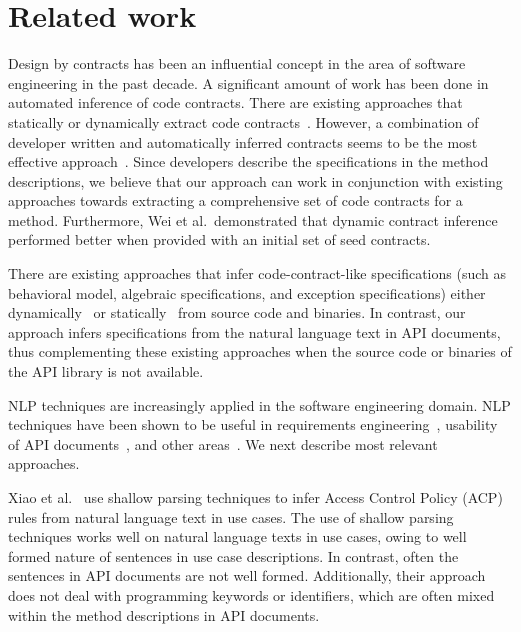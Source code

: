 \section{Related work}
\label{sec:related}


Design by contracts has been an influential concept in the area of software engineering in the past decade. A significant amount of work has been done in automated inference of code contracts. There are existing approaches that statically or dynamically extract code contracts~\cite{csallner08dysy, NimmerE02:ISSTA, Tillmann:2006:DLM:2105385.2105433}. However, a combination of developer written and automatically inferred contracts seems to be the most effective approach~\cite{FrakesIEEETran05,Polikarpova2009ISSTA}. Since developers describe the specifications in the method descriptions, we believe that our approach can work in conjunction with existing approaches towards extracting a comprehensive set of code contracts for a method. Furthermore, Wei et al.~\cite{WeiICSE11}demonstrated that dynamic contract inference performed better when provided with an initial set of seed contracts.




There are existing approaches that infer code-contract-like specifications (such as behavioral model, algebraic specifications, and exception specifications) either dynamically~\cite{Ghezzi:2009:SIB:1555001.1555057,Henkel07documentation,Henkel:2008:DDA:1363102.1363105} or statically~\cite{Buse:2008:ADI:1390630.1390664,FrakesIEEETran05} from source code and binaries. In contrast, our approach infers specifications from the natural language text in API documents, thus complementing these existing approaches when the source code or binaries of the API library is not available.


NLP techniques are increasingly applied in the software engineering domain. NLP techniques have been shown to be useful in requirements engineering~\cite{Gervasi2005,Sinha2009,Sinha2010}, usability of API documents~\cite{Dekel2009}, and other areas~\cite{Little2009,Zhou2008}. We next describe most relevant approaches. 

Xiao et al.~\cite{XiaoFSE2012} use shallow parsing techniques to infer Access Control Policy (ACP) rules from natural language text in use cases. The use of shallow parsing techniques works well on natural language texts in use cases, owing to well formed nature of sentences in use case descriptions. In contrast, often the sentences in API documents are not well formed. Additionally, their approach does not deal with programming keywords or identifiers, which are often mixed within the method descriptions in API documents.

